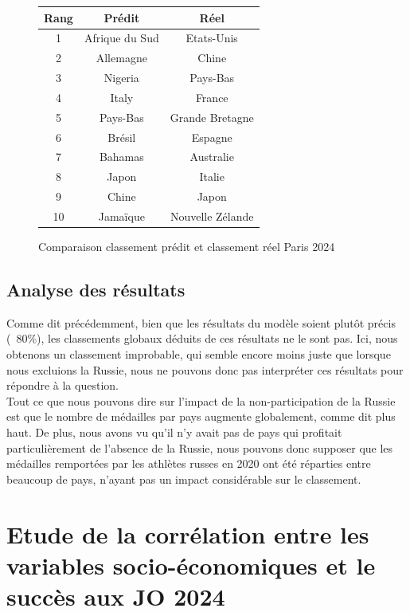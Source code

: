 \documentclass{article}
\begin{document}
\begin{figure}[H]
    \centering
    \begin{tabular}{|c|c|c|}
    \hline
        Rang & Prédit & Réel \\
        \hline
        1 & Afrique du Sud & Etats-Unis \\
        2 & Allemagne & Chine \\
        3 & Nigeria & Pays-Bas\\
        4 & Italy & France\\
        5 & Pays-Bas & Grande Bretagne\\
        6 & Brésil & Espagne\\
        7 & Bahamas &  Australie\\
        8 & Japon & Italie\\
        9 & Chine & Japon \\
        10 & Jamaïque & Nouvelle Zélande\\
    \hline
    \end{tabular}
    \caption{Comparaison classement prédit et classement réel Paris 2024}
    \label{tab:my_label}
\end{figure}

\subsection{Analyse des résultats}

Comme dit précédemment, bien que les résultats du modèle soient plutôt précis (~80\%), les classements globaux déduits de ces résultats ne le sont pas. Ici, nous obtenons un classement improbable, qui semble encore moins juste que lorsque nous excluions la Russie, nous ne pouvons donc pas interpréter ces résultats pour répondre à la question. 
\\\indent Tout ce que nous pouvons dire sur l'impact de la non-participation de la Russie est que le nombre de médailles par pays augmente globalement, comme dit plus haut. De plus, nous avons vu qu'il n'y avait pas de pays qui profitait particulièrement de l'absence de la Russie, nous pouvons donc supposer que les médailles remportées par les athlètes russes en 2020 ont été réparties entre beaucoup de pays, n'ayant pas un impact considérable sur le classement.

\section{Etude de la corrélation entre les variables socio-économiques et le succès aux JO 2024}
\end{document}
